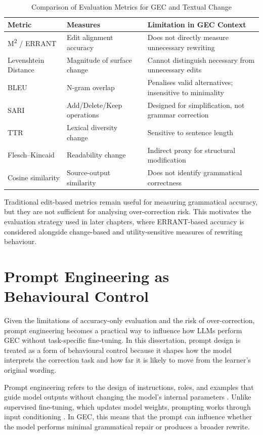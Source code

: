 \begin{table}[h]
\centering
\caption{Comparison of Evaluation Metrics for GEC and Textual Change}
\label{tab:metric_comparison}
\begin{tabular}{|p{3cm}|p{5cm}|p{6cm}|}
\hline
\textbf{Metric} & \textbf{Measures} & \textbf{Limitation in GEC Context} \\
\hline
M\textsuperscript{2} / ERRANT & Edit alignment accuracy & Does not directly measure unnecessary rewriting \\
\hline
Levenshtein Distance & Magnitude of surface change & Cannot distinguish necessary from unnecessary edits \\
\hline
BLEU & N-gram overlap & Penalises valid alternatives; insensitive to minimality \\
\hline
SARI & Add/Delete/Keep operations & Designed for simplification, not grammar correction \\
\hline
TTR & Lexical diversity change & Sensitive to sentence length \\
\hline
Flesch--Kincaid & Readability change & Indirect proxy for structural modification \\
\hline
Cosine similarity & Source-output similarity & Does not identify grammatical correctness \\
\hline
\end{tabular}
\end{table}

Traditional edit-based metrics remain useful for measuring grammatical accuracy, but they are not sufficient for analysing over-correction risk. This motivates the evaluation strategy used in later chapters, where ERRANT-based accuracy is considered alongside change-based and utility-sensitive measures of rewriting behaviour.

\section{Prompt Engineering as Behavioural Control}

Given the limitations of accuracy-only evaluation and the risk of over-correction, prompt engineering becomes a practical way to influence how LLMs perform GEC without task-specific fine-tuning. In this dissertation, prompt design is treated as a form of behavioural control because it shapes how the model interprets the correction task and how far it is likely to move from the learner's original wording.

Prompt engineering refers to the design of instructions, roles, and examples that guide model outputs without changing the model's internal parameters \cite{liu2023pretrain}. Unlike supervised fine-tuning, which updates model weights, prompting works through input conditioning \cite{NEURIPS2020_1457c0d6}. In GEC, this means that the prompt can influence whether the model performs minimal grammatical repair or produces a broader rewrite.

